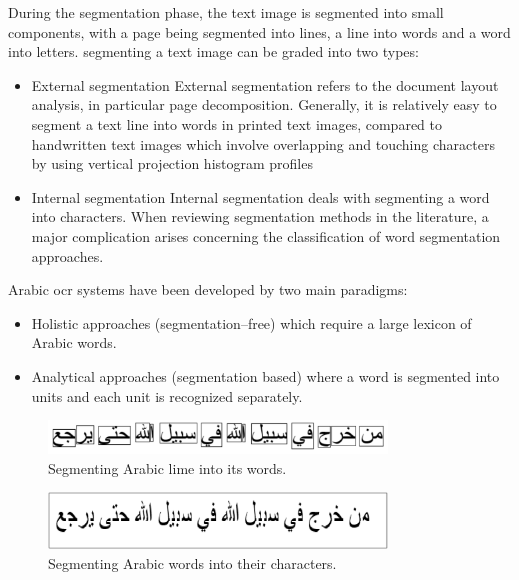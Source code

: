 \begin{itemize}[labelindent=1em,labelsep=0.25cm,leftmargin=*]
        During the segmentation phase, the text image is segmented into small components, with a page being segmented into lines, a line into words and a word into letters.
segmenting a text image can be graded into two types: 

\begin{itemize}[itemsep=1pt, topsep=5pt]
    \item External segmentation
    External segmentation refers to the document layout analysis, in particular page decomposition. Generally, it is relatively easy to segment a text line into words in printed text images, compared to handwritten text images which involve overlapping and touching characters by using vertical projection histogram profiles

    \item Internal segmentation
    Internal segmentation deals with segmenting a word into characters. When reviewing segmentation methods in the literature, a major complication arises concerning the classification of word segmentation approaches.

\end{itemize} 

Arabic \acrshort{ocr} systems have been developed by two main paradigms: 
\begin{itemize}[itemsep=1pt, topsep=5pt]
    \item Holistic approaches (segmentation–free) which require a large lexicon of Arabic words.
    \item Analytical approaches (segmentation based) where a word is segmented into units and each unit is recognized separately.
\end{itemize} 

\textbf{}
\begin{figure}[H]
    \centering
    \includegraphics[width=9cm]{images/word.png}
    \caption{Segmenting Arabic lime into its words.}
    \label{fig:word}
\end{figure}

\textbf{}
\begin{figure}[H]
    \centering
    \includegraphics[width=9cm]{images/char.png}
    \caption{Segmenting Arabic words into their characters.}
    \label{fig:char}
\end{figure}


\end{itemize}
